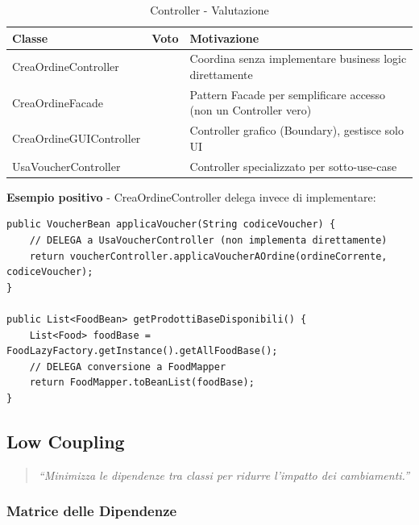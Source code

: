 \documentclass[12pt,a4paper]{article}
\newcommand{\ok}{\textcolor{okgreen}{\checkmark}}
\begin{document}
\begin{table}[h]
\centering
\begin{tabular}{|l|c|p{8cm}|}
\hline
\textbf{Classe} & \textbf{Voto} & \textbf{Motivazione} \\
\hline
CreaOrdineController & \ok & Coordina senza implementare business logic direttamente \\
\hline
CreaOrdineFacade & \ok & Pattern Facade per semplificare accesso (non un Controller vero) \\
\hline
CreaOrdineGUIController & \ok & Controller grafico (Boundary), gestisce solo UI \\
\hline
UsaVoucherController & \ok & Controller specializzato per sotto-use-case \\
\hline
\end{tabular}
\caption{Controller - Valutazione}
\end{table}

\textbf{Esempio positivo} - CreaOrdineController delega invece di implementare:

\begin{lstlisting}[style=javastyle, caption={Controller che Delega}]
public VoucherBean applicaVoucher(String codiceVoucher) {
    // DELEGA a UsaVoucherController (non implementa direttamente)
    return voucherController.applicaVoucherAOrdine(ordineCorrente, codiceVoucher);
}

public List<FoodBean> getProdottiBaseDisponibili() {
    List<Food> foodBase = FoodLazyFactory.getInstance().getAllFoodBase();
    // DELEGA conversione a FoodMapper
    return FoodMapper.toBeanList(foodBase);
}
\end{lstlisting}

\subsection{Low Coupling}

\begin{quote}
\textit{``Minimizza le dipendenze tra classi per ridurre l'impatto dei cambiamenti.''}
\end{quote}

\subsubsection{Matrice delle Dipendenze}
\end{document}
